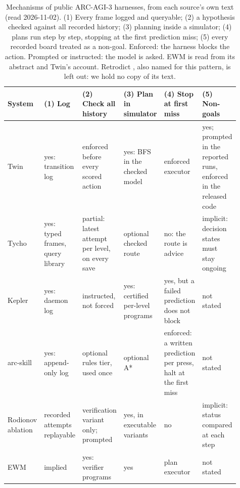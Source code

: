 \begin{table}[!htb]
\caption{Mechanisms of public ARC-AGI-3 harnesses, from each source's own text (read 2026-11-02). (1) Every frame logged and queryable; (2) a hypothesis checked against all recorded history; (3) planning inside a simulator; (4) plans run step by step, stopping at the first prediction miss; (5) every recorded board treated as a non-goal. Enforced: the harness blocks the action. Prompted or instructed: the model is asked. EWM is read from its abstract and Twin's account. Retrodict \citep{ryanbbrown2026retrodict}, also named for this pattern, is left out: we hold no copy of its text.}\label{tab:researchlit} %
\centering\footnotesize
\setlength{\tabcolsep}{3pt}
\begin{tabular}{@{}>{\raggedright\arraybackslash}p{0.12\linewidth}>{\raggedright\arraybackslash}p{0.14\linewidth}>{\raggedright\arraybackslash}p{0.17\linewidth}>{\raggedright\arraybackslash}p{0.14\linewidth}>{\raggedright\arraybackslash}p{0.17\linewidth}>{\raggedright\arraybackslash}p{0.17\linewidth}@{}}
\toprule
System & (1) Log & (2) Check all history & (3) Plan in simulator & (4) Stop at first miss & (5) Non-goals \\
\midrule
Twin \citep{skoutnev2026twin} & yes: transition log & enforced before every scored action & yes: BFS in the checked model & enforced executor & yes; prompted in the reported runs, enforced in the released code \\
Tycho \citep{lehmann2026tycho} & yes: typed frames, query library & partial: latest attempt per level, on every save & optional checked route & no: the route is advice & implicit: decision states must stay ongoing \\
Kepler \citep{wu2026kepler} & yes: daemon log & instructed, not forced & yes: certified per-level programs & yes, but a failed prediction does not block & not stated \\
arc-skill \citep{gowtham2026arcskill} & yes: append-only log & optional rules tier, used once & optional A* & enforced: a written prediction per press, halt at the first miss & not stated \\
Rodionov ablation \citep{rodionov2026ablation} & recorded attempts replayable & verification variant only; prompted & yes, in executable variants & no & implicit: status compared at each step \\
EWM \citep{rodionov2026ewm} & implied & yes: verifier programs & yes & plan executor & not stated \\
\bottomrule
\end{tabular}
\end{table}

